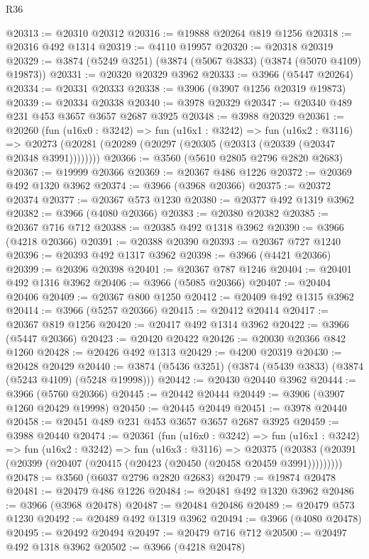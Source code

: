 \begin{lexlean}{R36}
\begin{coremodule}
@20313 := @20310 @20312
@20316 := @19888 @20264 @819 @1256
@20318 := @20316 @492 @1314
@20319 := @4110 @19957
@20320 := @20318 @20319
@20329 := @3874 (@5249 @3251) (@3874 (@5067 @3833) (@3874 (@5070 @4109) @19873))
@20331 := @20320 @20329 @3962
@20333 := @3966 (@5447 @20264)
@20334 := @20331 @20333
@20338 := @3906 (@3907 @1256 @20319 @19873)
@20339 := @20334 @20338
@20340 := @3978 @20329
@20347 := @20340 @489 @231 @453 @3657 @3657 @2687 @3925
@20348 := @3988 @20329
@20361 := @20260
    (fun (u16x0 : @3242) =>
    fun (u16x1 : @3242) =>
    fun (u16x2 : @3116) =>
    @20273 (@20281 (@20289 (@20297 (@20305 (@20313 (@20339 (@20347 @20348 @3991))))))))
@20366 := @3560 (@5610 @2805 @2796 @2820 @2683)
@20367 := @19999 @20366
@20369 := @20367 @486 @1226
@20372 := @20369 @492 @1320 @3962
@20374 := @3966 (@3968 @20366)
@20375 := @20372 @20374
@20377 := @20367 @573 @1230
@20380 := @20377 @492 @1319 @3962
@20382 := @3966 (@4080 @20366)
@20383 := @20380 @20382
@20385 := @20367 @716 @712
@20388 := @20385 @492 @1318 @3962
@20390 := @3966 (@4218 @20366)
@20391 := @20388 @20390
@20393 := @20367 @727 @1240
@20396 := @20393 @492 @1317 @3962
@20398 := @3966 (@4421 @20366)
@20399 := @20396 @20398
@20401 := @20367 @787 @1246
@20404 := @20401 @492 @1316 @3962
@20406 := @3966 (@5085 @20366)
@20407 := @20404 @20406
@20409 := @20367 @800 @1250
@20412 := @20409 @492 @1315 @3962
@20414 := @3966 (@5257 @20366)
@20415 := @20412 @20414
@20417 := @20367 @819 @1256
@20420 := @20417 @492 @1314 @3962
@20422 := @3966 (@5447 @20366)
@20423 := @20420 @20422
@20426 := @20030 @20366 @842 @1260
@20428 := @20426 @492 @1313
@20429 := @4200 @20319
@20430 := @20428 @20429
@20440 := @3874 (@5436 @3251) (@3874 (@5439 @3833) (@3874 (@5243 @4109) (@5248 @19998)))
@20442 := @20430 @20440 @3962
@20444 := @3966 (@5760 @20366)
@20445 := @20442 @20444
@20449 := @3906 (@3907 @1260 @20429 @19998)
@20450 := @20445 @20449
@20451 := @3978 @20440
@20458 := @20451 @489 @231 @453 @3657 @3657 @2687 @3925
@20459 := @3988 @20440
@20474 := @20361
    (fun (u16x0 : @3242) =>
    fun (u16x1 : @3242) =>
    fun (u16x2 : @3242) =>
    fun (u16x3 : @3116) =>
    @20375 (@20383 (@20391 (@20399 (@20407 (@20415 (@20423 (@20450 (@20458 @20459 @3991)))))))))
@20478 := @3560 (@6037 @2796 @2820 @2683)
@20479 := @19874 @20478
@20481 := @20479 @486 @1226
@20484 := @20481 @492 @1320 @3962
@20486 := @3966 (@3968 @20478)
@20487 := @20484 @20486
@20489 := @20479 @573 @1230
@20492 := @20489 @492 @1319 @3962
@20494 := @3966 (@4080 @20478)
@20495 := @20492 @20494
@20497 := @20479 @716 @712
@20500 := @20497 @492 @1318 @3962
@20502 := @3966 (@4218 @20478)

\end{coremodule}
\end{lexlean}
